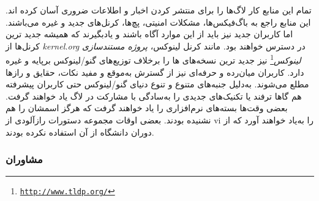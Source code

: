 تمام این منابع کار لاگ‌ها را برای منتشر کردن اخبار و اطلاعات
ضروری آسان کرده اند. این منابع راجع به باگ‌فیکس‌ها،
مشکلات امنیتی، پچ‌ها، کرنل‌های جدید و غیره می‌باشند.
اما کاربران جدید نیز باید از این موارد آگاه باشند
و یادبگیرند که همیشه جدید ترین کرنل‌ها از
\emph{kernel.org}
در دسترس خواهند بود. مانند کرنل لینوکس،
\emph{پروژه مستندسازی لینوکس}\footnote{\texttt{\url{http://www.tldp.org/}}}
نیز جدید ترین نسخه‌های ‌ها را برخلاف
توزیع‌های گنو/لینوکس برپایه  و غیره دارد.
کاربران میان‌رده و حرفه‌ای نیز از گسترش به‌موقع و مفید
نکات، حقایق و رازها مطلع می‌شوند.
به‌دلیل جنبه‌های متنوع و تنوع دنیای گنو/لینوکس حتی
کاربران پیشرفته هم گاها ترفند یا تکنیک‌های جدیدی را
به‌سادگی با مشارکت در لاگ یاد خواهند گرفت.
بعضی وقت‌ها بسته‌های نرم‌افزاری را یاد خواهند گرفت که
هرگز اسمشان را هم نشنیده بودند. بعضی اوقات مجموعه دستورات
رازآلودی از {\ttfamily vi} را به‌یاد خواهند آورد که از دوران
دانشگاه از آن استفاده نکرده بودند.

\subsubsection{مشاوران }

